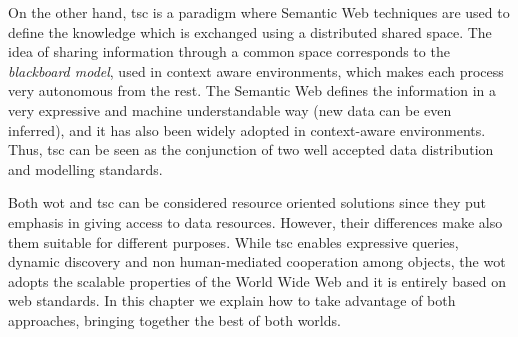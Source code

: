 On the other hand, \ac{tsc} is a paradigm where Semantic Web techniques are used to define the knowledge which is exchanged using a distributed shared space.
The idea of sharing information through a common space corresponds to the \textit{blackboard model}, used in context aware environments, which makes each process very autonomous from the rest.
The Semantic Web defines the information in a very expressive and machine understandable way (new data can be even inferred), and it has also been widely adopted in context-aware environments.
Thus, \ac{tsc} can be seen as the conjunction of two well accepted data distribution and modelling standards.

Both \ac{wot} and \ac{tsc} can be considered resource oriented solutions since they put emphasis in giving access to data resources.
However, their differences make also them suitable for different purposes.
While \ac{tsc} enables expressive queries, dynamic discovery and non human-mediated cooperation among objects, the \ac{wot} adopts the scalable properties of the World Wide Web and it is entirely based on web standards.
In this chapter we explain how to take advantage of both approaches, bringing together the best of both worlds.




